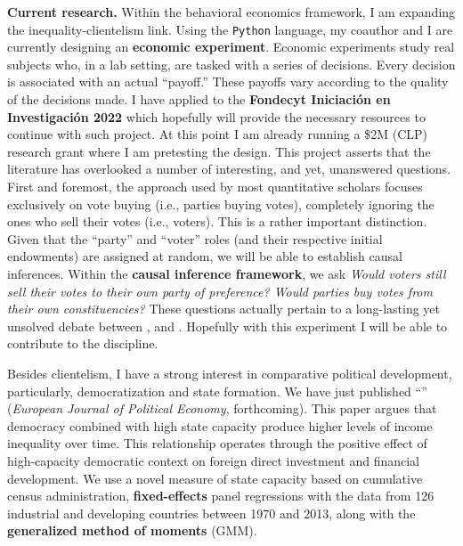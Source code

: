 \documentclass[10pt,stdletter,dateno,sigleft]{newlfm} %
\begin{document}
\begin{newlfm}
{\bf Current research.} Within the behavioral economics framework, I am expanding the inequality-clientelism link. Using the \texttt{Python} language, my coauthor and I are currently designing an {\bf economic experiment}. Economic experiments study real subjects who, in a lab setting, are tasked with a series of decisions. Every decision is associated with an actual ``payoff.'' These payoffs vary according to the quality of the decisions made. I have applied to the {\bf Fondecyt Iniciaci\'on en Investigaci\'on 2022} which hopefully will provide the necessary resources to continue with such project. At this point I am already running a \$2M (CLP) research grant where I am pretesting the design.  This project asserts that the literature has overlooked a number of interesting, and yet, unanswered questions. First and foremost, the approach used by most quantitative scholars focuses exclusively on vote buying (i.e., parties buying votes), completely ignoring the ones who sell their votes (i.e., voters). This is a rather important distinction. Given that the ``party'' and ``voter'' roles (and their respective initial endowments) are assigned at random, we will be able to establish causal inferences. Within the {\bf causal inference framework}, we ask \emph{Would voters still sell their votes to their own party of preference? Would parties buy votes from their own constituencies?} These questions actually pertain to a long-lasting yet unsolved debate between \textcite{Dixit1996}, \textcite{Cox1986} and \textcite{Stokes2005}. Hopefully with this experiment I will be able to contribute to the discipline.

Besides clientelism, I have a strong interest in comparative political development, particularly, democratization and state formation. We have just published ``\href{https://github.com/hbahamonde/Inequality_State_Capacity/raw/main/Bahamonde_Trasberg.pdf}{\unskip}'' (\emph{European Journal of Political Economy}, forthcoming). This paper argues that democracy combined with high state capacity produce higher levels of income inequality over time. This relationship operates through the positive effect of high-capacity democratic context on foreign direct investment and financial development. We use a novel measure of state capacity based on cumulative census administration, {\bf fixed-effects} panel regressions with the data from 126 industrial and developing countries between 1970 and 2013, along with the {\bf generalized method of moments} (GMM). 


\end{newlfm}
\end{document}
